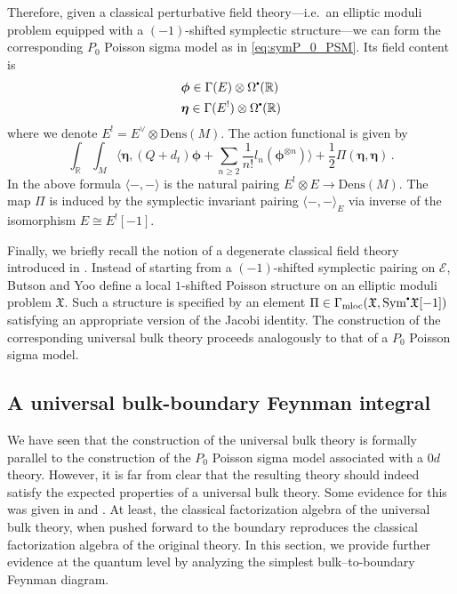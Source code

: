 \documentclass[11pt]{article}
\newcommand{\R}{\mathbb{R}}
\newcommand\sbullet[1][.5]{\mathbin{\vcenter{\hbox{\scalebox{#1}{$\bullet$}}}}}
\numberwithin{equation}{section}
\begin{document}
Therefore, given a classical perturbative field theory—i.e.\ an elliptic moduli problem equipped with a $(-1)$-shifted symplectic structure—we can form the corresponding $P_0$ Poisson sigma model as in \eqref{eq:symP_0_PSM}. Its field content is
\begin{equation}
	\begin{aligned}
		&\boldsymbol{\phi} \in \Gamma(E)\otimes\Omega^{\sbullet}(\R)\\
		&\boldsymbol{\eta}\in \Gamma(E^!)\otimes\Omega^{\sbullet}(\R)
	\end{aligned}
\end{equation}
where we denote $E^{!} = E^{\vee}\otimes\mathrm{Dens}(M)$. The action functional is given by
\begin{equation}
	\int_{\R}\int_M\langle \boldsymbol{\eta}, (Q + d_t)\boldsymbol{\phi} + \sum_{n \geq 2}\frac{1}{n!}l_n(\boldsymbol{\phi}^{\otimes n})\rangle + \frac{1}{2}\Pi(\boldsymbol{\eta},\boldsymbol{\eta})\,.
\end{equation}
In the above formula $\langle -,- \rangle$ is the natural pairing $E^!\otimes E \to \mathrm{Dens}(M)$. The map $\Pi$ is induced by the symplectic invariant pairing $\langle-,-\rangle_E$ via inverse of the isomorphism $E \cong E^![-1]$.

Finally, we briefly recall the notion of a degenerate classical field theory introduced in \cite{butson2016degenerate}. Instead of starting from a $(-1)$-shifted symplectic pairing on $\mathcal{E}$, Butson and Yoo define a local $1$-shifted Poisson structure on an elliptic moduli problem $\mathfrak{X}$. Such a structure is specified by an element $\Pi \in \Gamma_{\mathrm{mloc}}(\mathfrak{X}, \mathrm{Sym}^{\sbullet}\mathfrak{X}[-1])$ satisfying an appropriate version of the Jacobi identity. The construction of the corresponding universal bulk theory proceeds analogously to that of a $P_0$ Poisson sigma model.

\subsection{A universal bulk-boundary Feynman integral}
\label{sec:uni_bdy_int}
We have seen that the construction of the universal bulk theory is formally parallel to the construction of the $P_0$ Poisson sigma model associated with a $0d$ theory. However, it is far from clear that the resulting theory should indeed satisfy the expected properties of a universal bulk theory. Some evidence for this was given in \cite{butson2016degenerate} and \cite{rabinovich2022classical}. At least, the classical factorization algebra of the universal bulk theory, when pushed forward to the boundary reproduces the classical factorization algebra of the original theory. In this section, we provide further evidence at the quantum level by analyzing the simplest bulk--to-boundary Feynman diagram.
\end{document}
